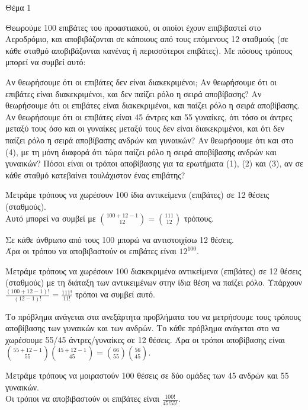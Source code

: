 \documentclass{assignment}
\begin{document}

\begin{problem}{Θέμα 1}

Θεωρούμε 100 επιβάτες του προαστιακού, οι οποίοι έχουν επιβιβαστεί στο Αεροδρόμιο, και αποβιβάζονται σε 
κάποιους από τους επόμενους 12 σταθμούς (σε κάθε σταθμό αποβιβάζονται κανένας ή περισσότεροι επιβάτες). 
Με πόσους τρόπους μπορεί να συμβεί αυτό: 

 Αν θεωρήσουμε ότι οι επιβάτες δεν είναι διακεκριμένοι;
 Αν θεωρήσουμε ότι οι επιβάτες είναι διακεκριμένοι, και δεν παίζει ρόλο η σειρά αποβίβασης?
 Αν θεωρήσουμε ότι οι επιβάτες είναι διακεκριμένοι, και παίζει ρόλο η σειρά αποβίβασης.
 Αν θεωρήσουμε ότι οι επιβάτες είναι 45 άντρες και 55 γυναίκες, ότι τόσο οι άντρες μεταξύ
τους όσο και οι γυναίκες μεταξύ τους δεν είναι διακεκριμένοι, και ότι δεν παίζει ρόλο  η σειρά αποβίβασης
ανδρών και γυναικών?
 Αν θεωρήσουμε ότι και στο (4), με τη μόνη διαφορά ότι τώρα παίζει ρόλο η σειρά αποβίβασης 
ανδρών και γυναικών?
 Πόσοι είναι οι τρόποι αποβίβασης για τα ερωτήματα (1), (2) και (3), αν σε κάθε σταθμό 
κατεβαίνει τουλάχιστον ένας επιβάτης?

\solution

\answer
Μετράμε τρόπους να χωρέσουν 100 ίδια αντικείμενα (επιβάτες) σε 12 θέσεις (σταθμούς). \\
Αυτό μπορεί να συμβεί με $\binom{100 + 12 - 1}{12} = \binom{111}{12}$ τρόπους.

\answer
Σε κάθε άνθρωπο από τους 100 μπορώ να αντιστοιχίσω 12 θέσεις.\\
Άρα οι τρόπου να αποβιβαστούν οι επιβάτες είναι $12^{100}$.

\answer
Μετράμε τρόπους να χωρέσουν 100 διακεκριμένα αντικείμενα (επιβάτες) σε 12 θέσεις (σταθμούς) 
με τη διάταξη των αντικειμένων στην ίδια θέση να παίζει ρόλο. 
Υπάρχουν $\frac{(100 + 12 - 1)!}{(12-1)!} = \frac{111!}{11!}$ τρόποι να συμβεί αυτό.

\answer
Το πρόβλημα ανάγεται στα ανεξάρτητα προβλήματα του να μετρήσουμε τους τρόπους αποβίβασης
των γυναικών και των ανδρών. Το κάθε πρόβλημα ανάγεται στο να χωρέσουμε 55/45 άντρες/γυναίκες
σε 12 θέσεις. Άρα οι τρόποι αποβίβασης είναι $\binom{55+12-1}{55}\binom{45+12-1}{45} = \binom{66}{55}\binom{56}{45}$.

\answer
Μετράμε τρόπους να μοιραστούν 100 θέσεις σε δύο ομάδες των 45 ανδρών και 55 γυναικών.\\
Οι τρόποι να αποβιβαστούν οι επιβάτες είναι $\frac{100!}{45!55!}$.


\end{problem}
\end{document}
